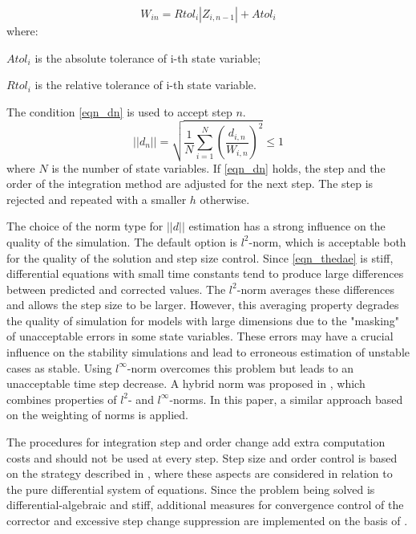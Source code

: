 \documentclass[lettersize,journal]{IEEEtran}
\begin{document}
\begin{equation}
	W_{in}=Rtol_i|Z_{i,n-1}|+Atol_i
\end{equation}
\noindent where:
\begin{description}
	\item \(Atol_i\) is the absolute tolerance of i-th state variable;
	\item \(Rtol_i\) is the relative tolerance of i-th state variable.
\end{description}

The condition \eqref{eqn_dn} is used to accept step \(n\). 
\begin{equation}
	\label{eqn_dn}
	\vert\vert d_n \vert\vert = \sqrt{\frac{1}{N} \sum_{i=1}^{N}{\left(\frac{d_{i,n}}{W_{i,n}}\right)^2}} \leq 1
\end{equation}
\noindent where \(N\) is the number of state variables.
If \eqref{eqn_dn} holds, the step and the order of the integration method are adjusted for the next step. The step is rejected and repeated with a smaller \(h\) otherwise.

The choice of the norm type for \(\vert\vert d\vert\vert \) estimation has a strong influence on the quality of the simulation. The default option is \(l^2\)-norm, which is acceptable both for the quality of the solution and step size control. Since \eqref{eqn_thedae} is stiff, differential equations with small time constants tend to produce large differences between predicted and corrected values. The \(l^2\)-norm averages these differences and allows the step size to be larger.  However, this averaging property degrades the quality of simulation for models with large dimensions due to the "masking" of unacceptable errors in some state variables. These errors may have a crucial influence on the stability simulations and lead to erroneous estimation of unstable cases as stable. Using \(l^\infty\)-norm overcomes this problem but leads to an unacceptable time step decrease. A hybrid norm was proposed in \cite{pegase10}, which combines properties of \(l^2\)- and \(l^\infty\)-norms. In this paper, a similar approach based on the weighting of norms is applied.

The procedures for integration step and order change add extra computation costs and should not be used at every step. Step size and order control is based on the strategy described in \cite{Radhakrishnan1993}, where these aspects are considered in relation to the pure differential system of equations. Since the problem being solved is differential-algebraic and stiff, additional measures for convergence control of the corrector and excessive step change suppression are implemented on the basis of \cite{petzold82}.
\end{document}
